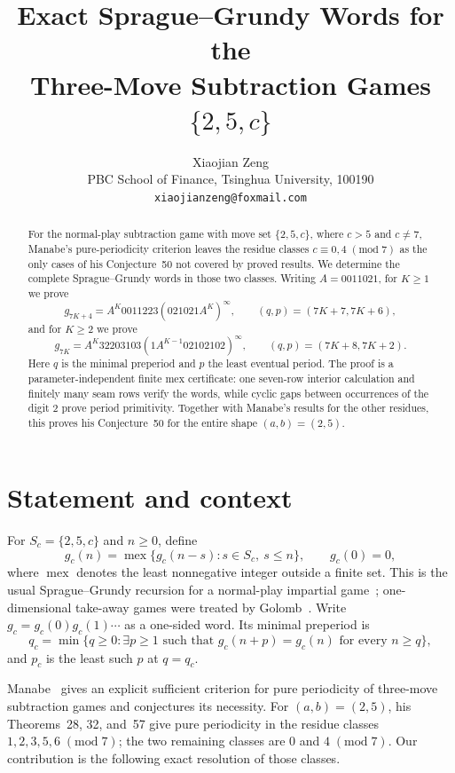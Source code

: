 \documentclass[11pt]{article}
\title{Exact Sprague--Grundy Words for the\\
Three-Move Subtraction Games $\{2,5,c\}$}
\author{Xiaojian Zeng\\
\small PBC School of Finance, Tsinghua University, 100190\\
\small \texttt{xiaojianzeng@foxmail.com}}
\date{}
\newcommand{\mex}{\operatorname{mex}}
\begin{document}
\maketitle

\begin{abstract}
For the normal-play subtraction game with move set $\{2,5,c\}$, where
$c>5$ and $c\ne7$, Manabe's pure-periodicity criterion leaves the residue
classes $c\equiv0,4\;(\mathrm{mod}\;7)$ as the only cases of his Conjecture~50 not
covered by proved results.  We determine the complete Sprague--Grundy words
in those two classes.  Writing $A=0011021$, for $K\ge1$ we prove
\[
 g_{7K+4}=A^K0011223(021021A^K)^\infty,
 \qquad(q,p)=(7K+7,7K+6),
\]
and for $K\ge2$ we prove
\[
 g_{7K}=A^K32203103(1A^{K-1}02102102)^\infty,
 \qquad(q,p)=(7K+8,7K+2).
\]
Here $q$ is the minimal preperiod and $p$ the least eventual period.
The proof is a parameter-independent finite mex certificate: one seven-row
interior calculation and finitely many seam rows verify the words, while
cyclic gaps between occurrences of the digit $2$ prove period primitivity.
Together with Manabe's results for the other residues, this proves his
Conjecture~50 for the entire shape $(a,b)=(2,5)$.
\end{abstract}

\section{Statement and context}

For $S_c=\{2,5,c\}$ and $n\ge0$, define
\[
 g_c(n)=\mex\{g_c(n-s):s\in S_c,\ s\le n\},
 \qquad g_c(0)=0,
\]
where $\mex$ denotes the least nonnegative integer outside a finite set.
This is the usual Sprague--Grundy recursion for a normal-play impartial
game~\cite{Grundy1939}; one-dimensional take-away games were treated by
Golomb~\cite{Golomb1966}.
Write $g_c=g_c(0)g_c(1)\cdots$ as a one-sided word.  Its minimal preperiod is
\[
 q_c=\min\{q\ge0:\exists p\ge1\text{ such that }
 g_c(n+p)=g_c(n)\text{ for every }n\ge q\},
\]
and $p_c$ is the least such $p$ at $q=q_c$.

Manabe~\cite{Manabe2026} gives an explicit sufficient criterion for pure
periodicity of three-move subtraction games and conjectures its necessity.
For $(a,b)=(2,5)$, his Theorems~28, 32, and~57 give pure periodicity in the
residue classes $1,2,3,5,6\;(\mathrm{mod}\;7)$; the two remaining classes are $0$ and
$4\;(\mathrm{mod}\;7)$.  Our contribution is the following exact resolution of those
classes.
\end{document}
